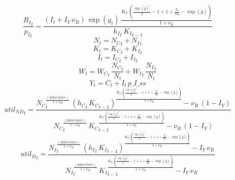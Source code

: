 \begin{dmath}
\frac{{{R_I}}_{t}}{{{p_I}}_{t}}=\frac{\left({{I}}_{t}+{{I_Y}}\, {{\nu_R}}\right)\, \exp\left({{g}}_{t}\right)\, \frac{{{K_Y}}\, \left(\frac{\exp\left({{\overline{g}}}\right)^{{{\gamma}}}}{{{\beta}}}-1+1+\frac{{{I_Y}}}{{{K_Y}}}-\exp\left({{\overline{g}}}\right)\right)}{1+{{\nu_R}}}}{{{h_I}}_{t}\, {{K_I}}_{t-1}}
\end{dmath}
\begin{dmath}
{{N}}_{t}={{N_C}}_{t}+{{N_I}}_{t}
\end{dmath}
\begin{dmath}
{{K}}_{t}={{K_C}}_{t}+{{K_I}}_{t}
\end{dmath}
\begin{dmath}
{{I}}_{t}={{I_C}}_{t}+{{I_I}}_{t}
\end{dmath}
\begin{dmath}
{{W}}_{t}={{W_C}}_{t}\, \frac{{{N_C}}_{t}}{{{N}}_{t}}+{{W_I}}_{t}\, \frac{{{N_I}}_{t}}{{{N}}_{t}}
\end{dmath}
\begin{dmath}
{{Y}}_{t}={{C}}_{t}+{{I}}_{t}\, {p\_I\_ss}
\end{dmath}
\begin{dmath}
{{util_{ND}}}_{t}=\frac{{{N_C}}_{t}^{\frac{{(labor share)}}{1+{{\nu_R}}}}\, \left({{h_C}}_{t}\, {{K_C}}_{t-1}\right)^{\frac{{{K_Y}}\, \left(\frac{\exp\left({{\overline{g}}}\right)^{{{\gamma}}}}{{{\beta}}}-1+1+\frac{{{I_Y}}}{{{K_Y}}}-\exp\left({{\overline{g}}}\right)\right)}{1+{{\nu_R}}}}-{{\nu_R}}\, \left(1-{{I_Y}}\right)}{{{N_C}}_{t}^{\frac{{(labor share)}}{1+{{\nu_R}}}}\, {{K_C}}_{t-1}^{\frac{{{K_Y}}\, \left(\frac{\exp\left({{\overline{g}}}\right)^{{{\gamma}}}}{{{\beta}}}-1+1+\frac{{{I_Y}}}{{{K_Y}}}-\exp\left({{\overline{g}}}\right)\right)}{1+{{\nu_R}}}}-{{\nu_R}}\, \left(1-{{I_Y}}\right)}
\end{dmath}
\begin{dmath}
{{util_D}}_{t}=\frac{{{N_I}}_{t}^{\frac{{(labor share)}}{1+{{\nu_R}}}}\, \left({{h_I}}_{t}\, {{K_I}}_{t-1}\right)^{\frac{{{K_Y}}\, \left(\frac{\exp\left({{\overline{g}}}\right)^{{{\gamma}}}}{{{\beta}}}-1+1+\frac{{{I_Y}}}{{{K_Y}}}-\exp\left({{\overline{g}}}\right)\right)}{1+{{\nu_R}}}}-{{I_Y}}\, {{\nu_R}}}{{{N_I}}_{t}^{\frac{{(labor share)}}{1+{{\nu_R}}}}\, {{K_I}}_{t-1}^{\frac{{{K_Y}}\, \left(\frac{\exp\left({{\overline{g}}}\right)^{{{\gamma}}}}{{{\beta}}}-1+1+\frac{{{I_Y}}}{{{K_Y}}}-\exp\left({{\overline{g}}}\right)\right)}{1+{{\nu_R}}}}-{{I_Y}}\, {{\nu_R}}}
\end{dmath}
